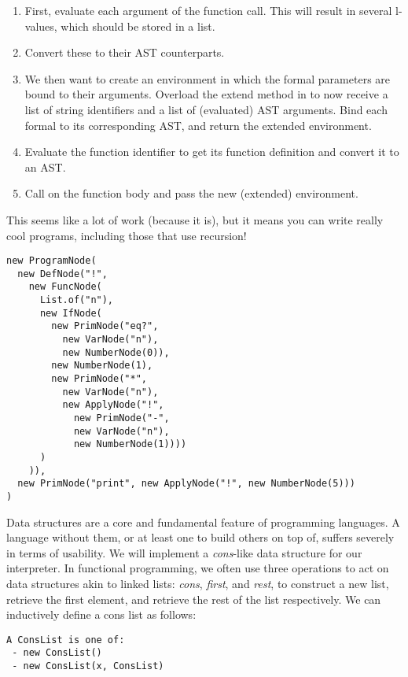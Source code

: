 \begin{enumerate}[label=(\alph*)]
  \begin{enumerate}[label=(\roman*)] 
  \item First, evaluate each argument of the function call. This will result in several l-values, which should be stored in a list. 
  \item Convert these to their AST counterparts. 
  \item We then want to create an environment in which the formal parameters are bound to their arguments. Overload the extend method in  to now receive a list of string identifiers and a list of (evaluated) AST arguments. Bind each formal to its corresponding AST, and return the extended environment. 
  \item Evaluate the function identifier to get its function definition and convert it to an AST.
  \item Call  on the function body and pass the new (extended) environment.
  \end{enumerate}
  This seems like a lot of work (because it is), but it means you can write really cool programs, including those that use recursion!
  \par{
\begin{verbatim}
new ProgramNode(
  new DefNode("!", 
    new FuncNode(
      List.of("n"),
      new IfNode(
        new PrimNode("eq?", 
          new VarNode("n"), 
          new NumberNode(0)),
        new NumberNode(1),
        new PrimNode("*", 
          new VarNode("n"), 
          new ApplyNode("!", 
            new PrimNode("-", 
            new VarNode("n"), 
            new NumberNode(1))))
      )
    )),
  new PrimNode("print", new ApplyNode("!", new NumberNode(5)))
)
\end{verbatim}
}
\end{enumerate}

Data structures are a core and fundamental feature of programming languages. A language without them, or at least one to build others on top of, suffers severely in terms of usability. We will implement a \textit{cons}-like data structure for our interpreter. In functional programming, we often use three operations to act on data structures akin to linked lists: \textit{cons}, \textit{first}, and \textit{rest}, to construct a new list, retrieve the first element, and retrieve the rest of the list respectively. We can inductively define a cons list as follows:

\par{
\begin{verbatim}
A ConsList is one of:
 - new ConsList()
 - new ConsList(x, ConsList)
\end{verbatim}
}

